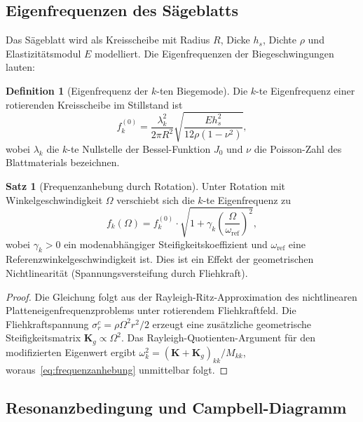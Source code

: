 ﻿\documentclass[a4paper,12pt]{article}
\theoremstyle{definition}
\newtheorem{definition}{Definition}
\newtheorem{satz}{Satz}
\begin{document}
\subsection{Eigenfrequenzen des Sägeblatts}

Das Sägeblatt wird als Kreisscheibe mit Radius $R$, Dicke $h_s$, Dichte $\rho$ und
Elastizitätsmodul $E$ modelliert. Die Eigenfrequenzen der Biegeschwingungen lauten:

\begin{definition}[Eigenfrequenz der $k$-ten Biegemode]
Die $k$-te Eigenfrequenz einer rotierenden Kreisscheibe im Stillstand ist
\begin{equation}
\label{eq:eigenfreq}
f_k^{(0)} = \frac{\lambda_k^2}{2\pi R^2}\sqrt{\frac{Eh_s^2}{12\rho(1-\nu^2)}},
\end{equation}
wobei $\lambda_k$ die $k$-te Nullstelle der Bessel-Funktion $J_0$ und $\nu$ die
Poisson-Zahl des Blattmaterials bezeichnen.
\end{definition}

\begin{satz}[Frequenzanhebung durch Rotation]
\label{satz:frequenzanhebung}
Unter Rotation mit Winkelgeschwindigkeit $\Omega$ verschiebt sich die $k$-te Eigenfrequenz zu
\begin{equation}
\label{eq:frequenzanhebung}
f_k(\Omega) = f_k^{(0)} \cdot \sqrt{1 + \gamma_k \left(\frac{\Omega}{\omega_{\mathrm{ref}}}\right)^2},
\end{equation}
wobei $\gamma_k > 0$ ein modenabhängiger Steifigkeitskoeffizient und $\omega_{\mathrm{ref}}$ eine
Referenzwinkelgeschwindigkeit ist. Dies ist ein Effekt der geometrischen Nichtlinearität
(Spannungsversteifung durch Fliehkraft).
\end{satz}

\begin{proof}
Die Gleichung folgt aus der Rayleigh-Ritz-Approximation des nichtlinearen Platteneigenfrequenzproblems
unter rotierendem Fliehkraftfeld. Die Fliehkraftspannung $\sigma_r^c = \rho\Omega^2 r^2/2$ erzeugt
eine zusätzliche geometrische Steifigkeitsmatrix $\mathbf{K}_g \propto \Omega^2$. Das Rayleigh-Quotienten-Argument
für den modifizierten Eigenwert ergibt $\omega_k^2 = (\mathbf{K} + \mathbf{K}_g)_{kk}/M_{kk}$,
woraus~\eqref{eq:frequenzanhebung} unmittelbar folgt.
\end{proof}

\subsection{Resonanzbedingung und Campbell-Diagramm}
\end{document}
